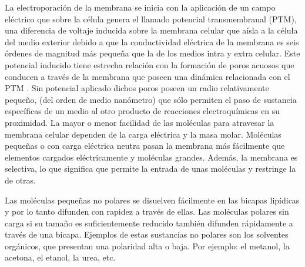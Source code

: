 La electroporación de la membrana se inicia con la aplicación de un campo eléctrico que sobre la célula genera el llamado potencial transmembranal (PTM), una diferencia de voltaje inducida sobre la membrana celular que aísla a la célula del medio exterior \cite{c5-puchiar} debido a que la conductividad eléctrica de la membrana es seis órdenes de magnitud más pequeña que la de los medios intra y extra celular. Este potencial inducido tiene estrecha relación con la formación de poros acuosos que conducen a través de la membrana que poseen una dinámica relacionada con el PTM \cite{c8}. Sin potencial aplicado dichos poros poseen un radio relativamente pequeño, (del orden de medio nanómetro) que sólo permiten el paso de sustancia específicas de un medio al otro producto de reacciones electroquímicas en su proximidad. La mayor o menor facilidad de las moléculas para atravesar la membrana celular dependen de la carga eléctrica y la masa molar. Moléculas pequeñas o con carga eléctrica neutra pasan la membrana más fácilmente que elementos cargados eléctricamente y moléculas grandes. Además, la membrana es selectiva, lo que significa que permite la entrada de unas moléculas y restringe la de otras.

Las moléculas pequeñas no polares se disuelven fácilmente en las bicapas lipídicas y por lo tanto difunden con rapidez a través de ellas. Las moléculas polares sin carga si su tamaño es suficientemente reducido también difunden rápidamente a través de una bicapa. Ejemplos de estas sustancias no polares son los solventes orgánicos, que presentan una polaridad alta o baja. Por ejemplo: el metanol, la acetona, el etanol, la urea, etc. 

